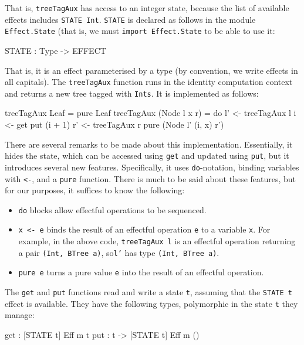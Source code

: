 \noindent
That is, \texttt{treeTagAux} has access to an integer state, because the list of available effects includes \texttt{STATE Int}. \texttt{STATE} is declared as follows in the module \texttt{Effect.State} (that is, we must \texttt{import Effect.State} to be able to use it:

\begin{code}
STATE : Type -> EFFECT
\end{code}

\noindent
That is, it is an effect parameterised by a type (by convention, we write effects in all capitals).
The \texttt{treeTagAux} function runs in the identity computation context and returns a new tree tagged with \texttt{Ints}.
It is implemented as follows:

\begin{code}
treeTagAux Leaf = pure Leaf
treeTagAux (Node l x r)
    = do l' <- treeTagAux l
         i <- get
         put (i + 1)
         r' <- treeTagAux r
         pure (Node l' (i, x) r')
\end{code}

\noindent
There are several remarks to be made about this implementation.
Essentially, it hides the state, which can be accessed using \texttt{get} and updated using \texttt{put}, but it introduces several new features.
Specifically, it uses \texttt{do}-notation, binding variables with \texttt{<-}, and a \texttt{pure} function.
There is much to be said about these features, but for our purposes, it suffices to know the following:

\begin{itemize}
\item \texttt{do} blocks allow effectful operations to be sequenced.
\item \texttt{x <- e} binds the result of an effectful operation \texttt{e} to a variable \texttt{x}. For example, in the above code, \texttt{treeTagAux l} is an effectful operation returning a pair \texttt{(Int, BTree a)}, so\texttt{l'} has type \texttt{(Int, BTree a)}.
\item \texttt{pure e} turns a pure value \texttt{e} into the result of
an effectful operation. 
\end{itemize}

\noindent
The \texttt{get} and \texttt{put} functions read and write a state \texttt{t}, assuming that the \texttt{STATE t} effect is available.
They have the following types, polymorphic in the state \texttt{t} they manage:

\begin{code}
get :      { [STATE t] } Eff m t
put : t -> { [STATE t] } Eff m () 
\end{code}


